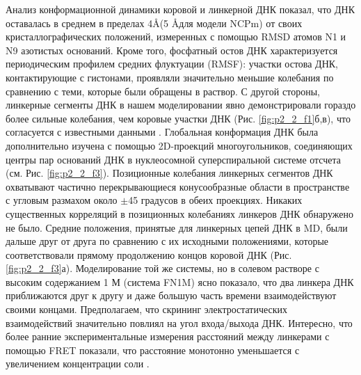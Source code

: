     Анализ конформационной динамики коровой и линкерной ДНК показал, что ДНК оставалась в среднем в пределах 4\AA (5 \AA для модели NCPm) от своих кристаллографических положений, измеренных с помощью RMSD атомов N1 и N9 азотистых оснований. Кроме того, фосфатный остов ДНК характеризуется периодическим профилем средних флуктуации (RMSF): участки остова ДНК, контактирующие с гистонами, проявляли значительно меньшие колебания по сравнению с теми, которые были обращены в раствор. С другой стороны, линкерные сегменты ДНК в нашем моделировании явно демонстрировали гораздо более сильные колебания, чем коровые участки ДНК (Рис. \ref{fig:p2_2_f1}б,в), что согласуется с известными данными \cite{pachov_structure_2011}. Глобальная конформация ДНК была дополнительно изучена с помощью 2D-проекций многоугольников, соединяющих центры пар оснований ДНК в нуклеосомной суперспиральной системе отсчета (см. Рис. \ref{fig:p2_2_f3}). Позиционные колебания линкерных сегментов ДНК охватывают частично перекрывающиеся конусообразные области в пространстве с угловым размахом около $\pm$45 градусов в обеих проекциях. Никаких существенных корреляций в позиционных колебаниях линкеров ДНК обнаружено не было. Средние положения, принятые для линкерных цепей ДНК в MD, были дальше друг от друга по сравнению с их исходными положениями, которые соответствовали прямому продолжению концов коровой ДНК (Рис. \ref{fig:p2_2_f3}а). Моделирование той же системы, но в солевом растворе с высоким содержанием 1 М (система FN1M) ясно показало, что два линкера ДНК приближаются друг к другу и даже большую часть времени взаимодействуют своими концами. Предполагаем, что скрининг электростатических взаимодействий значительно повлиял на угол входа/выхода ДНК. Интересно, что более ранние экспериментальные измерения расстояний между линкерами с помощью FRET показали, что расстояние монотонно уменьшается с увеличением концентрации соли \cite{toth_chromatin_2006}.

